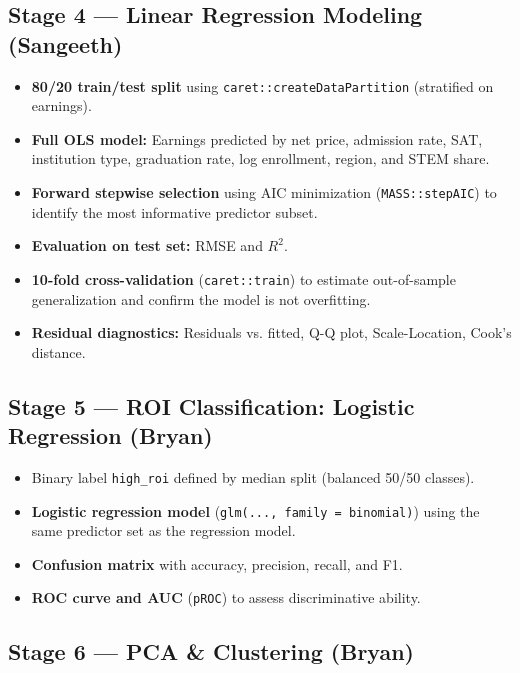 \documentclass[12pt, letterpaper]{article}
\begin{document}
\subsection{Stage 4 — Linear Regression Modeling (Sangeeth)}

\begin{itemize}
  \item \textbf{80/20 train/test split} using \texttt{caret::createDataPartition} (stratified on earnings).
  \item \textbf{Full OLS model:} Earnings predicted by net price, admission rate, SAT, institution type, graduation rate, log enrollment, region, and STEM share.
  \item \textbf{Forward stepwise selection} using AIC minimization (\texttt{MASS::stepAIC}) to identify the most informative predictor subset.
  \item \textbf{Evaluation on test set:} RMSE and $R^2$.
  \item \textbf{10-fold cross-validation} (\texttt{caret::train}) to estimate out-of-sample generalization and confirm the model is not overfitting.
  \item \textbf{Residual diagnostics:} Residuals vs. fitted, Q-Q plot, Scale-Location, Cook's distance.
\end{itemize}

\subsection{Stage 5 — ROI Classification: Logistic Regression (Bryan)}

\begin{itemize}
  \item Binary label \texttt{high\_roi} defined by median split (balanced 50/50 classes).
  \item \textbf{Logistic regression model} (\texttt{glm(..., family = binomial)}) using the same predictor set as the regression model.
  \item \textbf{Confusion matrix} with accuracy, precision, recall, and F1.
  \item \textbf{ROC curve and AUC} (\texttt{pROC}) to assess discriminative ability.
\end{itemize}

\subsection{Stage 6 — PCA \& Clustering (Bryan)}
\end{document}
